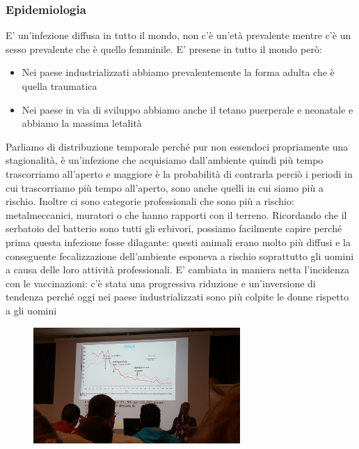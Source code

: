 \subsubsection{Epidemiologia}

  E' un'infezione diffusa in tutto il mondo, non c'è un'età prevalente
  mentre c'è un sesso prevalente che è quello femminile. E' presene in
  tutto il mondo però:

\begin{itemize}
\item
  Nei paese industrializzati abbiamo prevalentemente la forma adulta che
  è quella traumatica
\item
  Nei paese in via di sviluppo abbiamo anche il tetano puerperale e
  neonatale e abbiamo la massima letalità
\end{itemize}
  Parliamo di distribuzione temporale perché pur non essendoci
  propriamente una stagionalità, è un'infezione che acquisiamo
  dall'ambiente quindi più tempo trascorriamo all'aperto e maggiore è la
  probabilità di contrarla perciò i periodi in cui trascorriamo più
  tempo all'aperto, sono anche quelli in cui siamo più a rischio.
  Inoltre ci sono categorie professionali che sono più a rischio:
  metalmeccanici, muratori o che hanno rapporti con il terreno.
  Ricordando che il serbatoio del batterio sono tutti gli erbivori,
  possiamo facilmente capire perché prima questa infezione fosse
  dilagante: questi animali erano molto più diffusi e la conseguente
  fecalizzazione dell'ambiente esponeva a rischio soprattutto gli uomini
  a causa delle loro attività professionali. E' cambiata in maniera
  netta l'incidenza con le vaccinazioni: c'è stata una progressiva
  riduzione e un'inversione di tendenza perché oggi nei paese
  industrializzati sono più colpite le donne rispetto a gli uomini

  \begin{figure}[!ht]
\centering
\includegraphics[width=0.7\textwidth]{06/image6.jpeg}
\end{figure}

